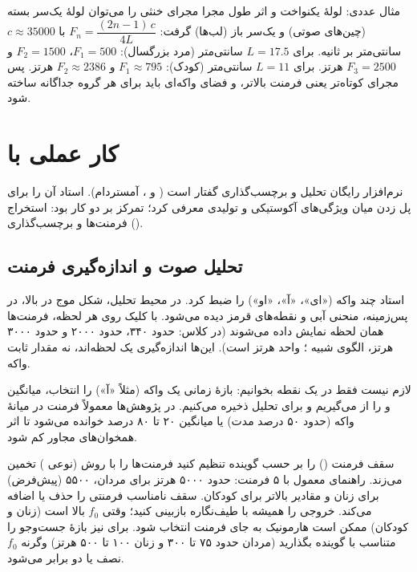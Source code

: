 \begin{addedbox}{مثال عددی: لولهٔ یکنواخت و اثر طول مجرا}
مجرای خنثی را می‌توان لولهٔ یک‌سر بسته (چین‌های صوتی) و یک‌سر باز (لب‌ها) گرفت: $F_n=\dfrac{(2n-1)\,c}{4L}$ با $c\approx 35000$ سانتی‌متر بر ثانیه. برای $L=17.5$ سانتی‌متر (مرد بزرگسال): $F_1=500$، $F_2=1500$ و $F_3=2500$ هرتز. برای $L=11$ سانتی‌متر (کودک): $F_1\approx 795$ و $F_2\approx 2386$ هرتز. پس مجرای کوتاه‌تر یعنی فرمنت بالاتر، و فضای واکه‌ای باید برای هر گروه جداگانه ساخته شود.
\end{addedbox}

\section{کار عملی با }
 نرم‌افزار رایگان تحلیل و برچسب‌گذاری گفتار است ( و ، آمستردام). استاد آن را برای پل زدن میان ویژگی‌های آکوستیکی و تولیدی معرفی کرد؛ تمرکز بر دو کار بود: استخراج فرمنت‌ها و برچسب‌گذاری ().

\subsection{تحلیل صوت و اندازه‌گیری فرمنت}
استاد چند واکه («ای»، «آ»، «او») را ضبط کرد. در محیط تحلیل، شکل موج در بالا،  در پس‌زمینه، منحنی آبی  و نقطه‌های قرمز  دیده می‌شود. با کلیک روی هر لحظه، فرمنت‌ها همان لحظه نمایش داده می‌شوند (در کلاس:  حدود ۳۴۰،  حدود ۲۰۰۰ و  حدود ۳۰۰۰ هرتز، الگوی شبیه ؛ واحد هرتز است). این‌ها اندازه‌گیری یک لحظه‌اند، نه مقدار ثابت واکه.

لازم نیست فقط در یک نقطه بخوانیم: بازهٔ زمانی یک واکه (مثلاً «آ») را انتخاب، میانگین  و  را از  می‌گیریم و برای تحلیل ذخیره می‌کنیم. در پژوهش‌ها معمولاً فرمنت در میانهٔ واکه (حدود ۵۰ درصد مدت) یا میانگین ۲۰ تا ۸۰ درصد خوانده می‌شود تا اثر همخوان‌های مجاور کم شود.

\begin{correctionbox}{سقف فرمنت () را بر حسب گوینده تنظیم کنید}
 فرمنت‌ها را با روش  (نوعی ) تخمین می‌زند. راهنمای معمول با ۵ فرمنت: حدود ۵۰۰۰ هرتز برای مردان، ۵۵۰۰ (پیش‌فرض) برای زنان و مقادیر بالاتر برای کودکان. سقف نامناسب فرمنتی را حذف یا اضافه می‌کند. خروجی را همیشه با طیف‌نگاره بازبینی کنید؛ وقتی $f_0$ بالا است (زنان و کودکان) ممکن است هارمونیک به جای فرمنت انتخاب شود. برای  نیز بازهٔ جست‌وجو را متناسب با گوینده بگذارید (مردان حدود ۷۵ تا ۳۰۰ و زنان ۱۰۰ تا ۵۰۰ هرتز) وگرنه $f_0$ نصف یا دو برابر می‌شود.
\end{correctionbox}

